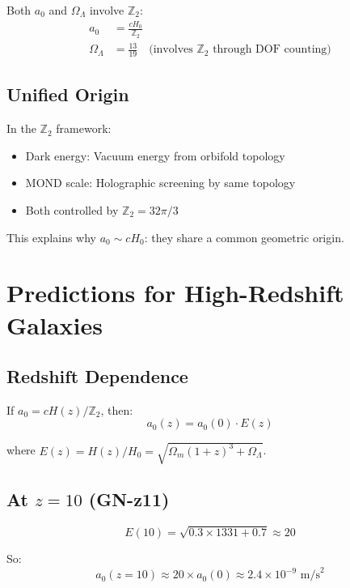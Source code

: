 \documentclass[12pt,a4paper]{article}
\begin{document}
Both $a_0$ and $\Omega_\Lambda$ involve $\mathbb{Z}_2$:
\begin{align}
a_0 &= \frac{cH_0}{\mathbb{Z}_2} \\
\Omega_\Lambda &= \frac{13}{19} \quad \text{(involves } \mathbb{Z}_2 \text{ through DOF counting)}
\end{align}

\subsection{Unified Origin}

In the $\mathbb{Z}_2$ framework:
\begin{itemize}
    \item Dark energy: Vacuum energy from orbifold topology
    \item MOND scale: Holographic screening by same topology
    \item Both controlled by $\mathbb{Z}_2 = 32\pi/3$
\end{itemize}

This explains why $a_0 \sim cH_0$: they share a common geometric origin.

\section{Predictions for High-Redshift Galaxies}

\subsection{Redshift Dependence}

If $a_0 = cH(z)/\mathbb{Z}_2$, then:
\begin{equation}
a_0(z) = a_0(0) \cdot E(z)
\end{equation}

where $E(z) = H(z)/H_0 = \sqrt{\Omega_m(1+z)^3 + \Omega_\Lambda}$.

\subsection{At $z = 10$ (GN-z11)}

\begin{equation}
E(10) = \sqrt{0.3 \times 1331 + 0.7} \approx 20
\end{equation}

So:
\begin{equation}
a_0(z=10) \approx 20 \times a_0(0) \approx 2.4 \times 10^{-9} \text{ m/s}^2
\end{equation}
\end{document}
